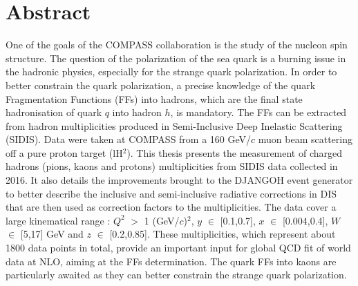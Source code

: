 


\begingroup
\let\clearpage\relax
\let\cleardoublepage\relax
\let\cleardoublepage\relax

\chapter*{Abstract}

One of the goals of the COMPASS collaboration is the study of the nucleon spin structure. The question of the polarization of the sea quark is a burning issue in the hadronic physics, especially for the strange quark polarization. In order to better constrain the quark polarization, a precise knowledge of the quark Fragmentation Functions (FFs) into hadrons, which are the final state hadronisation of quark $q$ into hadron $h$, is mandatory. The FFs can be extracted from hadron multiplicities produced in Semi-Inclusive Deep Inelastic Scattering (SIDIS). Data were taken at COMPASS from a 160 GeV/$c$ muon beam scattering off a pure proton target (lH$^2$). This thesis presents the measurement of charged hadrons (pions, kaons and protons) multiplicities from SIDIS data collected in 2016. It also details the improvements brought to the DJANGOH event generator to better describe the inclusive and semi-inclusive radiative corrections in DIS that are then used as correction factors to the multiplicities. The data cover a large kinematical range : $Q^2$ $>$ 1 (GeV/$c$)$^2$, $y$ $\in$ [0.1,0.7], $x$ $\in$ [0.004,0.4], $W$ $\in$ [5,17] GeV and $z$ $\in$ [0.2,0.85]. These multiplicities, which represent about 1800 data points in total, provide an important input for global QCD fit of world data at NLO, aiming at the FFs determination. The quark FFs into kaons are particularly awaited as they can better constrain the strange quark polarization.

\vspace{2cm}

